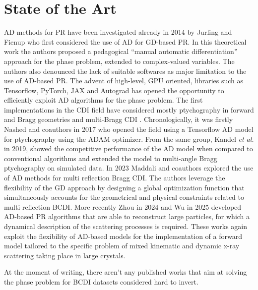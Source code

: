 \section{State of the Art}
AD methods for PR have been investigated already in 2014 by Jurling and Fienup \cite{Fienup_AD} who first considered the use of 
AD for GD-based PR. In this theoretical work the authors proposed a pedagogical ``manual automatic 
differentiation'' approach for the phase problem, extended to complex-valued variables. The authors also denounced the 
lack of suitable softwares as major limitation to the use of AD-based PR. The advent of high-level, GPU oriented, libraries such 
as Tensorflow, PyTorch, JAX and Autograd has opened the opportunity to efficiently exploit AD algorithms for the phase problem. 
The first implementations in the CDI field have considered mostly ptychography in forward and Bragg geometries \cite{Nashed_2017, Kandel_2019} 
and multi-Bragg CDI \cite{Maddali_2023}. Chronologically, it was firstly Nashed and coauthors in 2017 \cite{Nashed_2017} 
who opened the field using a Tensorflow AD model for ptychography using the ADAM optimizer. From the same group, Kandel 
\textit{et al.} in 2019, showed the competitive performance of the AD model when compared to conventional algorithms and 
extended the model to multi-angle Bragg ptychography on simulated data. In 2023 Maddali and coauthors \cite{Maddali_2023} explored 
the use of AD methods for multi reflection Bragg CDI. The authors leverage the flexibility of the GD approach by designing a global 
optimization function that simultaneously accounts for the geometrical and physical constraints related to multi reflection 
BCDI. More recently Zhou in 2024 \cite{Tagaki_2024} and Wu in 2025 \cite{tagaki_2025} developed AD-based PR algorithms that 
are able to reconstruct large particles, for which a dynamical description of the scattering processes is required. These 
works again exploit the flexibility of AD-based models for the implementation of a forward model tailored to the specific 
problem of mixed kinematic and dynamic x-ray scattering taking place in large crystals. 

At the moment of writing, there aren't any published works that aim at solving the phase problem for BCDI 
datasets considered hard to invert.

